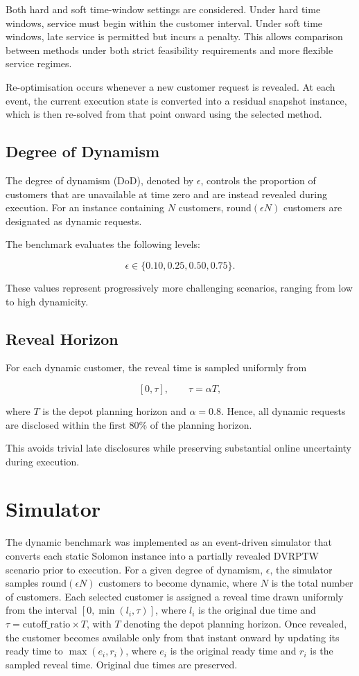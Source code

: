 Both hard and soft time-window settings are considered. Under hard time windows,
service must begin within the customer interval. Under soft time windows, late
service is permitted but incurs a penalty. This allows comparison between
methods under both strict feasibility requirements and more flexible service
regimes.

Re-optimisation occurs whenever a new customer request is revealed. At each
event, the current execution state is converted into a residual snapshot
instance, which is then re-solved from that point onward using the selected
method.

\subsection*{Degree of Dynamism}

The degree of dynamism (DoD), denoted by $\epsilon$, controls the proportion of
customers that are unavailable at time zero and are instead revealed during
execution. For an instance containing $N$ customers, $\mathrm{round}(\epsilon
N)$ customers are designated as dynamic requests.

The benchmark evaluates the following levels:

\[
    \epsilon \in \{0.10, 0.25, 0.50, 0.75\}.
\]

These values represent progressively more challenging scenarios, ranging from
low to high dynamicity.

\subsection*{Reveal Horizon}

For each dynamic customer, the reveal time is sampled uniformly from

\[
[0,\tau], \qquad \tau = \alpha T,
\]

where $T$ is the depot planning horizon and $\alpha = 0.8$. Hence, all dynamic
requests are disclosed within the first 80\% of the planning horizon.

This avoids trivial late disclosures while preserving substantial online
uncertainty during execution.

\section{Simulator}
The dynamic benchmark was implemented as an event-driven simulator that converts
each static Solomon instance into a partially revealed DVRPTW scenario prior to
execution. For a given degree of dynamism, $\epsilon$, the simulator samples
$\mathrm{round}(\epsilon N)$ customers to become dynamic, where $N$ is the total
number of customers. Each selected customer is assigned a reveal time drawn
uniformly from the interval $[0,
        \min(l_i,\tau)]$,
where $l_i$ is the original due time and $\tau=\text{cutoff\_ratio}\times T$,
with $T$ denoting the depot planning horizon. Once revealed, the customer
becomes available only from that instant onward by updating its ready time to
$\max(e_i,r_i)$, where $e_i$ is the original ready time and $r_i$ is the sampled
reveal time. Original due times are preserved.

